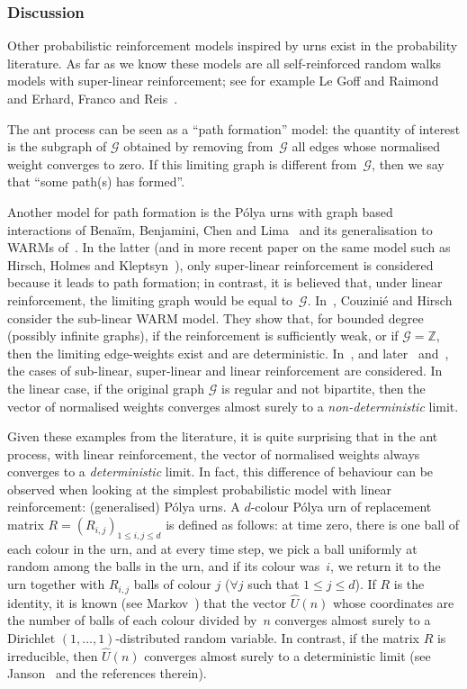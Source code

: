 \subsubsection*{Discussion}
Other {probabilistic reinforcement} models inspired by urns exist in the probability literature.
As far as we know these models are all self-reinforced random walks models with super-linear reinforcement;
see for example Le Goff and Raimond~\cite{LGR} and Erhard, Franco and Reis~\cite{EFR}.

The ant process can be seen as a ``path formation'' model:
the quantity of interest is the subgraph of $\mathcal G$
obtained by removing from~$\mathcal G$ all edges whose normalised weight converges to zero.
If this limiting graph is different from~$\mathcal G$, then we say that ``some path(s) has formed''.

Another model for path formation is the Pólya urns with graph based interactions
of Benaïm, Benjamini, Chen and Lima~\cite{BBCL}
and its generalisation to WARMs of~\cite{WARM}.
In the latter (and in more recent paper on the same model such as Hirsch, Holmes and Kleptsyn~\cite{WARM_new}),
only super-linear reinforcement is considered because it leads to path formation;
in contrast, it is believed that, under linear reinforcement,
the limiting graph would be equal to~$\mathcal G$.
{In~\cite{CH21}, Couzinié and Hirsch consider the sub-linear WARM model.
They show that, for bounded degree (possibly infinite graphs),
if the reinforcement is sufficiently weak, or if $\mathcal G = \mathbb Z$,
then the limiting edge-weights exist and are deterministic.}
In~\cite{BBCL}, and later~\cite{CL} and~\cite{Lima},
the cases of sub-linear, super-linear and linear reinforcement are considered.
In the linear case, if the original graph $\mathcal G$ is regular and not bipartite,
then the vector of normalised weights converges almost surely
to a \emph{non-deterministic} limit.

Given these examples from the literature, it is quite surprising that in the ant process, with linear
reinforcement, the vector of normalised weights always converges to a \emph{deterministic} limit.
In fact, this difference of behaviour can be observed when looking at the simplest probabilistic model with linear reinforcement: (generalised) Pólya urns.
A $d$-colour Pólya urn of replacement matrix $R = (R_{i,j})_{1\leq i,j\leq d}$ is defined as follows:
at time zero, there is one ball of each colour in the urn, and
at every time step, we pick a ball uniformly at random among the balls in the urn, and if its colour was~$i$, we return it to the urn together with $R_{i,j}$ balls of colour $j$ ($\forall j$  such that $1\leq j\leq d$).
If $R$ is the identity, it is known (see Markov~\cite{Markov}) that the vector $\hat U(n)$ whose coordinates are the number of balls of each colour divided by~$n$ converges almost surely to a Dirichlet $(1, \ldots, 1)$-distributed random variable.
In contrast, if the matrix $R$ is irreducible, then $\hat U(n)$ converges almost surely to a deterministic limit (see Janson~\cite{Janson04} and the references therein).

